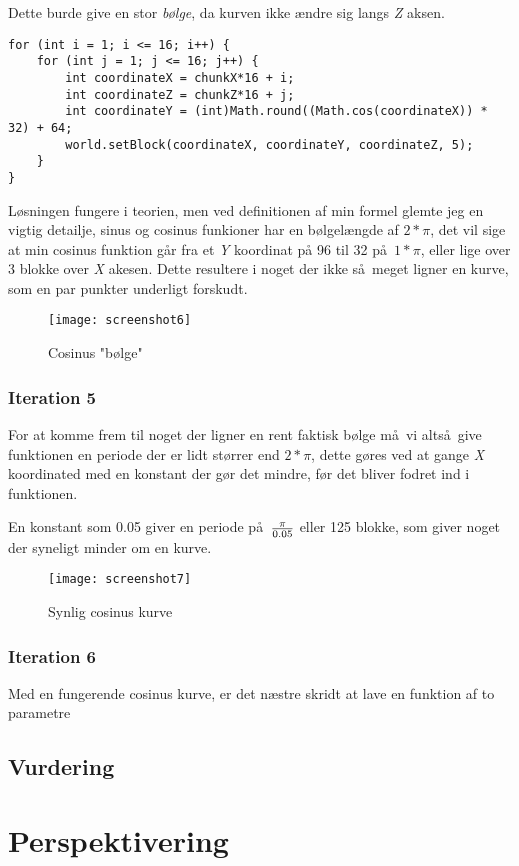 \documentclass[a4paper,12pt]{report}
\begin{document}
			Dette burde give en stor \emph{b\o lge}, da kurven ikke \ae ndre sig langs \emph{Z} aksen.

\begin{lstlisting}[label=SRPWorldGenerator2,caption=SRPWorldGenerator.java]
for (int i = 1; i <= 16; i++) {
    for (int j = 1; j <= 16; j++) {
        int coordinateX = chunkX*16 + i;
        int coordinateZ = chunkZ*16 + j;
        int coordinateY = (int)Math.round((Math.cos(coordinateX)) * 32) + 64;
        world.setBlock(coordinateX, coordinateY, coordinateZ, 5);
    }
}
\end{lstlisting}
	
			L\o sningen fungere i teorien, men ved definitionen af min formel glemte jeg en vigtig detailje, sinus og cosinus funkioner har
			en b\o lgel\ae ngde af \(2 * \pi \), det vil sige at min cosinus funktion g\aa r fra et \emph{Y} koordinat på 96 til 32 p\aa \ \(1 * \pi \),
			eller lige over 3 blokke over \emph{X} akesen. Dette resultere i noget der ikke s\aa \ meget ligner en kurve, som en par punkter underligt
			forskudt.

			\begin{wrapfigure}{r}{0.5\textwidth}
				\texttt{[image: screenshot6]}
				\caption{Cosinus "b\o lge"}
			\end{wrapfigure}

		\subsubsection{Iteration 5}
			For at komme frem til noget der ligner en rent faktisk b\o lge m\aa \ vi alts\aa \ give funktionen en periode der er lidt st\o rrer
			end \(2 * \pi \), dette gøres ved at gange \emph{X} koordinated med en konstant der g\o r det mindre, f\o r det bliver fodret
			ind i funktionen.

			En konstant som 0.05 giver en periode p\aa \ \( \pi \over 0.05\) eller 125 blokke, som giver noget der syneligt
			minder om en kurve.

			\begin{wrapfigure}{r}{0.5\textwidth}
				\texttt{[image: screenshot7]}
				\caption{Synlig cosinus kurve}
			\end{wrapfigure}

		 \subsubsection{Iteration 6}
			Med en fungerende cosinus kurve, er det n\ae stre skridt at lave en funktion af to parametre

	\subsection{Vurdering}
	\section{Perspektivering}
\end{document}
